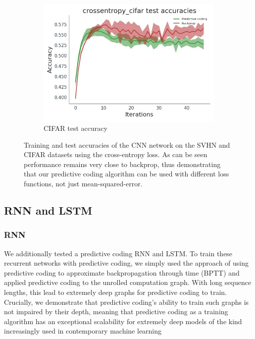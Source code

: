 \begin{figure}
        \begin{subfigure}[b]{0.475\textwidth}   
            \centering 
            \includegraphics[width=\textwidth]{chapter_6_figures/crossentropy_cifar_test accuracies_prelim_2.jpg}
            \caption[]
            {{\small CIFAR test accuracy}}    
        \end{subfigure}
        \caption{\small Training and test accuracies of the CNN network on the SVHN and CIFAR datasets using the cross-entropy loss. As can be seen performance remains very close to backprop, thus demonstrating that our predictive coding algorithm can be used with different loss functions, not just mean-squared-error.} 
       
        \label{PCBP_CNN_acc}
    \end{figure}

\subsection{RNN and LSTM}
\subsubsection{RNN}
We additionally tested a predictive coding RNN and LSTM. To train these recurrent networks with predictive coding, we simply used the approach of using predictive coding to approximate backpropagation through time (BPTT) and applied predictive coding to the unrolled computation graph. With long sequence lengths, this lead to extremely deep graphs for predictive coding to train. Crucially, we demonstrate that predictive coding's ability to train such graphs is not impaired by their depth, meaning that predictive coding as a training algorithm has an exceptional scalability for extremely deep models of the kind increasingly used in contemporary machine learning \citep{radford2019language,he2016deep}



